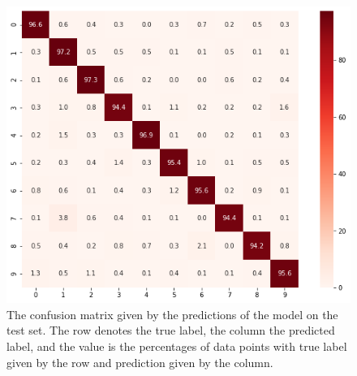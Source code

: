 \documentclass[12pt]{article}
\begin{document}
\begin{figure}[h]
	\centering
	\includegraphics[width=.7\textwidth]{confusion_matrix}
	\caption{The confusion matrix  given by the predictions of the model on the test set. The row denotes the true label, the column the predicted label, and the value is the percentages of data points with true label given by the row and prediction given by the column.}
	\label{fig:conf_mat}
\end{figure}



\end{document}
